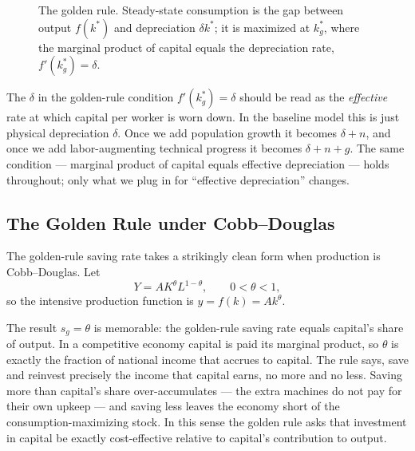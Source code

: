 \begin{figure}[h]
\centering

\caption{The golden rule. Steady-state consumption is the gap between output $f(k^*)$ and depreciation $\delta k^*$; it is maximized at $k_g^*$, where the marginal product of capital equals the depreciation rate, $f'(k_g^*) = \delta$.}
\label{fig:macro-3}
\end{figure}

\begin{remark}
The $\delta$ in the golden-rule condition $f'(k_g^*) = \delta$ should be read as the \emph{effective} rate at which capital per worker is worn down. In the baseline model this is just physical depreciation $\delta$. Once we add population growth it becomes $\delta + n$, and once we add labor-augmenting technical progress it becomes $\delta + n + g$. The same condition --- marginal product of capital equals effective depreciation --- holds throughout; only what we plug in for ``effective depreciation'' changes.
\end{remark}

\subsection{The Golden Rule under Cobb--Douglas}

The golden-rule saving rate takes a strikingly clean form when production is Cobb--Douglas. Let
\[
Y = A K^{\theta} L^{1-\theta}, \qquad 0 < \theta < 1,
\]
so the intensive production function is $y = f(k) = A k^{\theta}$.


The result $s_g = \theta$ is memorable: the golden-rule saving rate equals capital's share of output. In a competitive economy capital is paid its marginal product, so $\theta$ is exactly the fraction of national income that accrues to capital. The rule says, save and reinvest precisely the income that capital earns, no more and no less. Saving more than capital's share over-accumulates --- the extra machines do not pay for their own upkeep --- and saving less leaves the economy short of the consumption-maximizing stock. In this sense the golden rule asks that investment in capital be exactly cost-effective relative to capital's contribution to output.

